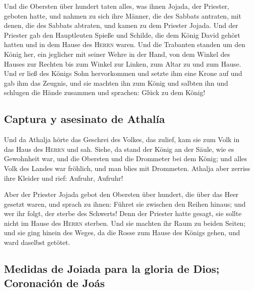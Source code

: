  Und die Obersten über hundert taten alles, was ihnen
Jojada, der Priester, geboten hatte, und nahmen zu sich ihre Männer, die
des Sabbats antraten, mit denen, die des Sabbats abtraten, und kamen zu
dem Priester Jojada.  Und der Priester gab den
Hauptleuten Spieße und Schilde, die dem König David gehört hatten und in
dem Hause des \textsc{Herrn} waren.  Und die Trabanten
standen um den König her, ein jeglicher mit seiner Wehre in der Hand,
von dem Winkel des Hauses zur Rechten bis zum Winkel zur Linken, zum
Altar zu und zum Hause.  Und er ließ des Königs Sohn
hervorkommen und setzte ihm eine Krone auf und gab ihm das Zeugnis, und
sie machten ihn zum König und salbten ihn und schlugen die Hände
zusammen und sprachen: Glück zu dem König!

\hypertarget{captura-y-asesinato-de-athaluxeda}{%
\subsection{Captura y asesinato de
Athalía}\label{captura-y-asesinato-de-athaluxeda}}

 Und da Athalja hörte das Geschrei des Volkes, das
zulief, kam sie zum Volk in das Haus des \textsc{Herrn} 
und sah. Siehe, da stand der König an der Säule, wie es Gewohnheit war,
und die Obersten und die Drommeter bei dem König; und alles Volk des
Landes war fröhlich, und man blies mit Drommeten. Athalja aber zerriss
ihre Kleider und rief: Aufruhr, Aufruhr!

 Aber der Priester Jojada gebot den Obersten über
hundert, die über das Heer gesetzt waren, und sprach zu ihnen: Führet
sie zwischen den Reihen hinaus; und wer ihr folgt, der sterbe des
Schwerts! Denn der Priester hatte gesagt, sie sollte nicht im Hause des
\textsc{Herrn} sterben.  Und sie machten ihr Raum zu
beiden Seiten; und sie ging hinein des Weges, da die Rosse zum Hause des
Königs gehen, und ward daselbst getötet.

\hypertarget{medidas-de-joiada-para-la-gloria-de-dios-coronaciuxf3n-de-jouxe1s}{%
\subsection{Medidas de Joiada para la gloria de Dios; Coronación de
Joás}\label{medidas-de-joiada-para-la-gloria-de-dios-coronaciuxf3n-de-jouxe1s}}

